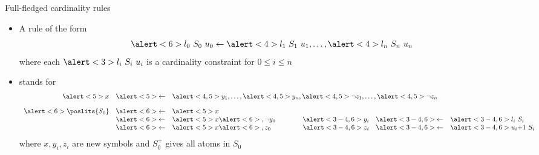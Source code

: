 \begin{frame}{Full-fledged cardinality rules}
  \begin{itemize}
  \item A rule of the form
    \[
      \alert<6>{l_0~S_0~u_0}\leftarrow\alert<4>{l_1~S_1~u_1},\dots,\alert<4>{l_n~S_n~u_n}
    \]
    where each $\alert<3>{l_i~S_i~u_i}$ is a cardinality constraint for $0\leq i\leq n$
  \item<only@2-> [] stands for
    \[
      \begin{array}{rclp{20pt}rcl}
                    \alert<5>{x}&\alert<5>{\leftarrow}&\multicolumn{5}{l}{\alert<4,5>{y_1},\dots,\alert<4,5>{y_n},\alert<4,5>{\neg z_1},\dots,\alert<4,5>{\neg z_n}}\\[10pt]
        \alert<6>{\poslits{S_0}}&\alert<6>{\leftarrow}&\alert<5>{x}\\
                                &\alert<6>{\leftarrow}&\alert<5>{x}\alert<6>{,\neg y_0}&&\alert<3-4,6>{y_i}&\alert<3-4,6>{\leftarrow}&\alert<3-4,6>{l_i~S_i}\\
                                &\alert<6>{\leftarrow}&\alert<5>{x}\alert<6>{,     z_0}&&\alert<3-4,6>{z_i}&\alert<3-4,6>{\leftarrow}&\alert<3-4,6>{u_i{+}1~S_i}
      \end{array}
    \]
    where $x,y_i,z_i$ are new symbols and $S_0^+$ gives all atoms in $S_0$
  \end{itemize}
\end{frame}
%
